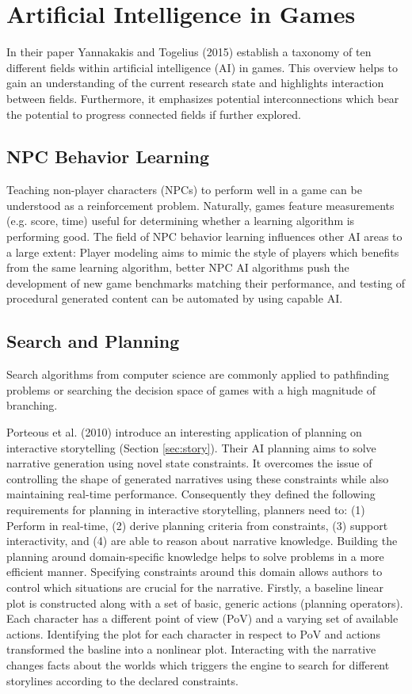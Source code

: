 \section{Artificial Intelligence in Games} \label{sec:ai}
In their paper Yannakakis and Togelius (2015) \cite{Yannakakis2015} establish a taxonomy of ten different fields within artificial intelligence (AI) in games.
This overview helps to gain an understanding of the current research state and highlights interaction between fields.
Furthermore, it emphasizes potential interconnections which bear the potential to progress connected fields if further explored.

\subsection{NPC Behavior Learning} \label{sec:npc-behavior-learning}
Teaching non-player characters (NPCs) to perform well in a game can be understood as a reinforcement problem.
Naturally, games feature measurements (e.g. score, time) useful for determining whether a learning algorithm is performing good.
The field of NPC behavior learning influences other AI areas to a large extent: Player modeling aims to mimic the style of players which benefits from the same learning algorithm, better NPC AI algorithms push the development of new game benchmarks matching their performance, and testing of procedural generated content can be automated by using capable AI.

\subsection{Search and Planning} \label{sec:search-and-planning}
Search algorithms from computer science are commonly applied to pathfinding problems or searching the decision space of games with a high magnitude of branching.

Porteous et al. (2010) \cite{Porteous2010} introduce an interesting application of planning on interactive storytelling (Section \ref{sec:story}).
Their AI planning aims to solve narrative generation using novel state constraints.
It overcomes the issue of controlling the shape of generated narratives using these constraints while also maintaining real-time performance.
Consequently they defined the following requirements for planning in interactive storytelling, planners need to: (1) Perform in real-time, (2) derive planning criteria from constraints, (3) support interactivity, and (4) are able to reason about narrative knowledge.
Building the planning around domain-specific knowledge helps to solve problems in a more efficient manner.
Specifying constraints around this domain allows authors to control which situations are crucial for the narrative.
Firstly, a baseline linear plot is constructed along with a set of basic, generic actions (planning operators).
Each character has a different point of view (PoV) and a varying set of available actions.
Identifying the plot for each character in respect to PoV and actions transformed the basline into a nonlinear plot.
Interacting with the narrative changes facts about the worlds which triggers the engine to search for different storylines according to the declared constraints.

